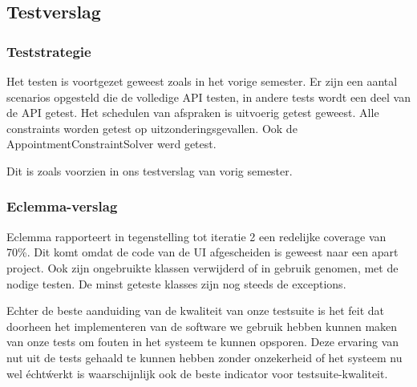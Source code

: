 \documentclass[a4paper]{article}
\begin{document}
\subsection{Testverslag}
\subsubsection{Teststrategie}
Het testen is voortgezet geweest zoals in het vorige semester. Er zijn een aantal scenarios opgesteld die de volledige API testen, in andere tests wordt een deel van de API getest. Het schedulen van afspraken is uitvoerig getest geweest. Alle constraints worden getest op uitzonderingsgevallen. Ook de AppointmentConstraintSolver werd getest.

Dit is zoals voorzien in ons testverslag van vorig semester.

\subsubsection{Eclemma-verslag} %
Eclemma rapporteert in tegenstelling tot iteratie 2 een redelijke coverage van 70\%. Dit komt omdat de code van de UI afgescheiden is geweest naar een apart project. Ook zijn ongebruikte klassen verwijderd of in gebruik genomen, met de nodige testen. De minst geteste klasses zijn nog steeds de exceptions.

Echter de beste aanduiding van de kwaliteit van onze testsuite is het feit dat doorheen het implementeren van de software we gebruik hebben kunnen maken van onze tests om fouten in het systeem te kunnen opsporen. Deze ervaring van nut uit de tests gehaald te kunnen hebben zonder onzekerheid of het systeem nu wel \'echt\' werkt is waarschijnlijk ook de beste indicator voor testsuite-kwaliteit.
\end{document}
